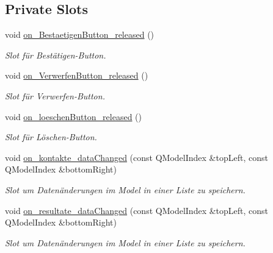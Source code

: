 \subsection*{Private Slots}
\begin{CompactItemize}
\item 
void \hyperlink{class_table_edit_dialog_b3ae208e0e028f4030875efe33e3de48}{on\_\-BestaetigenButton\_\-released} ()
\begin{CompactList}\small\item\em Slot für Bestätigen-Button. \item\end{CompactList}\item 
void \hyperlink{class_table_edit_dialog_d10a162c0554577a222a34cd918e3d1f}{on\_\-VerwerfenButton\_\-released} ()
\begin{CompactList}\small\item\em Slot für Verwerfen-Button. \item\end{CompactList}\item 
void \hyperlink{class_table_edit_dialog_0ccad25795df2d282741c21eeca778e6}{on\_\-loeschenButton\_\-released} ()
\begin{CompactList}\small\item\em Slot für Löschen-Button. \item\end{CompactList}\item 
void \hyperlink{class_table_edit_dialog_24028bd71ab1cee427967807e85e29fe}{on\_\-kontakte\_\-dataChanged} (const QModelIndex \&topLeft, const QModelIndex \&bottomRight)
\begin{CompactList}\small\item\em Slot um Datenänderungen im Model in einer Liste zu speichern. \item\end{CompactList}\item 
void \hyperlink{class_table_edit_dialog_d09fb68dc6ea3de8056d088099db6b67}{on\_\-resultate\_\-dataChanged} (const QModelIndex \&topLeft, const QModelIndex \&bottomRight)
\begin{CompactList}\small\item\em Slot um Datenänderungen im Model in einer Liste zu speichern. \item\end{CompactList}\end{CompactItemize}
